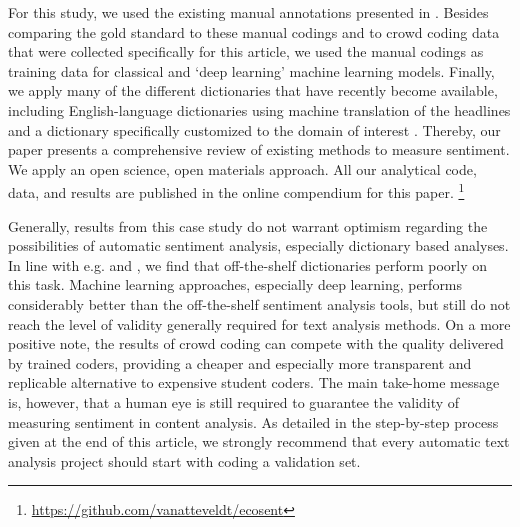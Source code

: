 For this study, we used the existing manual annotations presented in \citet{boukes2019}.
Besides comparing the gold standard to these manual codings and to crowd coding data that were collected specifically for this article, 
we used the manual codings as training data for classical and `deep learning' machine learning models.
Finally, we apply many of the different dictionaries that have recently become available,
including English-language dictionaries using machine translation of the headlines \citep[e.g. as suggested by][]{devries2018} and a dictionary specifically customized to the domain of interest \citep[suggested by][]{muddiman2019}. 
Thereby, our paper presents a comprehensive review of existing methods to measure sentiment.
We apply an open science, open materials approach. 
All our analytical code, data, and results are published in the online compendium for this paper.%
\footnote{\url{https://github.com/vanatteveldt/ecosent}}

Generally, results from this case study do not warrant optimism regarding the possibilities of automatic sentiment analysis, especially dictionary based analyses. 
In line with e.g. \citet{soroka15} and \citet{boukes2019}, we find that off-the-shelf dictionaries perform poorly on this task.
Machine learning approaches, especially deep learning, performs considerably better than the off-the-shelf sentiment analysis tools, 
but still do not reach the level of validity generally required for text analysis methods. 
On a more positive note, the results of crowd coding can compete with the quality delivered by trained coders, providing a cheaper and especially more transparent and replicable alternative to expensive student coders. 
The main take-home message is, however, that a human eye is still required to guarantee the validity of measuring sentiment in content analysis.
As detailed in the step-by-step process given at the end of this article, we strongly recommend that every automatic text analysis project should start with coding a validation set. 
